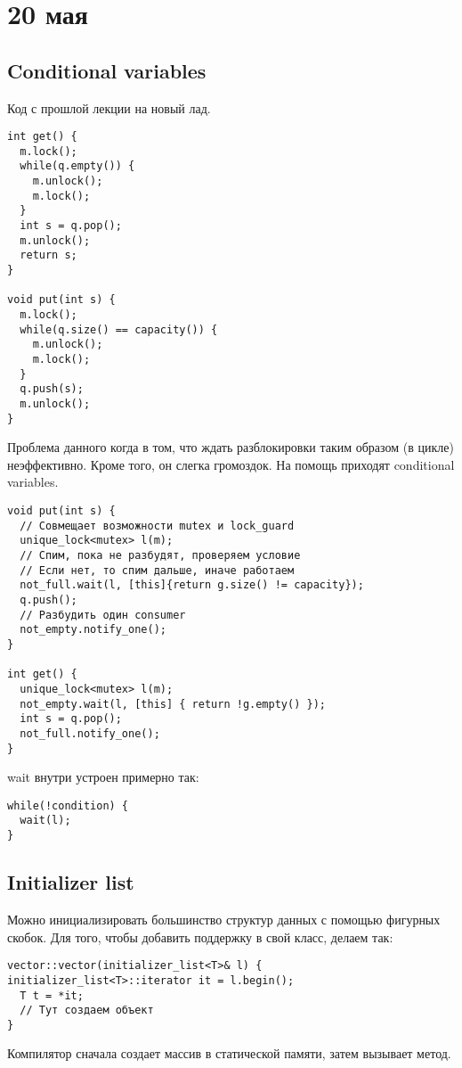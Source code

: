 \section{20 мая}

\subsection{Conditional variables}

Код с прошлой лекции на новый лад.
\begin{verbatim}
int get() {
  m.lock();
  while(q.empty()) {
    m.unlock();
    m.lock();
  }
  int s = q.pop();
  m.unlock();
  return s;
}

void put(int s) {
  m.lock();
  while(q.size() == capacity()) {
    m.unlock();
    m.lock();
  }
  q.push(s);
  m.unlock();
}
\end{verbatim}

Проблема данного когда в том, что ждать разблокировки таким образом (в цикле) неэффективно. Кроме того, он слегка громоздок.
На помощь приходят conditional variables.
\begin{verbatim}
void put(int s) {
  // Совмещает возможности mutex и lock_guard
  unique_lock<mutex> l(m);
  // Спим, пока не разбудят, проверяем условие
  // Если нет, то спим дальше, иначе работаем
  not_full.wait(l, [this]{return g.size() != capacity});
  q.push();
  // Разбудить один consumer
  not_empty.notify_one();
}

int get() {
  unique_lock<mutex> l(m);
  not_empty.wait(l, [this] { return !g.empty() });
  int s = q.pop();
  not_full.notify_one();
}
\end{verbatim}

wait внутри устроен примерно так:
\begin{verbatim}
while(!condition) {
  wait(l);
}
\end{verbatim}


\subsection{Initializer list}
Можно инициализировать большинство структур данных с помощью фигурных скобок.
Для того, чтобы добавить поддержку в свой класс, делаем так:

\begin{verbatim}
vector::vector(initializer_list<T>& l) {
initializer_list<T>::iterator it = l.begin();
  T t = *it;
  // Тут создаем объект
}

\end{verbatim}
Компилятор сначала создает массив в статической памяти, затем вызывает метод.

